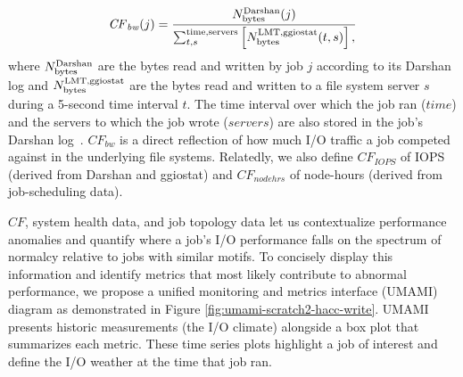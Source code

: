 \vspace{-.1in}
\begin{equation} \label{eq:cf}
    \mathit{CF}_{\mathit{bw}}(j) = \frac{N_{\textup{bytes}}^{\textup{Darshan}}(j)}
    {\sum_{t,s}^{\textup{time,servers}}
    \left [ N_{\textup{bytes}}^{\textup{LMT,ggiostat}}(t,s) \right ] , }
\end{equation}
%
where 
$N_{\textup{bytes}}^{\textup{Darshan}}$ are the bytes read and written by job $j$ according to its Darshan log and 
$N_{\textup{bytes}}^{\textup{LMT,ggiostat}}$ are the bytes read and written to a file system server $s$ during a 5-second time interval $t$.
The time interval over which the job ran ($\mathit{time}$) and the servers to which the job wrote ($\mathit{servers}$) are also stored in the job's Darshan log~\cite{snyder2016modular}.
$\mathit{CF}_{\mathit{bw}}$ is a direct reflection of how much I/O traffic a job competed against in the underlying file systems.
Relatedly, we also define $\mathit{CF}_{\mathit{IOPS}}$ of IOPS (derived from Darshan and ggiostat) and $\mathit{CF}_{\mathit{nodehrs}}$ of node-hours (derived from job-scheduling data).


$\mathit{CF}$, system health data, and job topology data let us contextualize performance anomalies and quantify where a job's I/O performance falls on the spectrum of normalcy relative to jobs with similar motifs.
To concisely display this information and identify metrics that most likely contribute to abnormal performance, we propose a unified monitoring and metrics interface (UMAMI) diagram as demonstrated in Figure \ref{fig:umami-scratch2-hacc-write}.
UMAMI presents historic measurements (the I/O climate) alongside a box plot that summarizes each metric.
These time series plots highlight a job of interest and define the I/O weather at the time that job ran.

